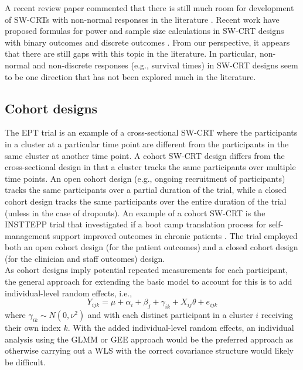\documentclass[10pt]{article}
\begin{document}
A recent review paper commented that there is still much room for development of SW-CRTs with non-normal responses in the literature \parencite{Li:2021}. Recent work have proposed formulas for power and sample size calculations in SW-CRT designs with binary outcomes \parencite{Wang:2021} and discrete outcomes \parencite{Xia:2021}. From our perspective, it appears that there are still gaps with this topic in the literature. In particular, non-normal and non-discrete responses (e.g., survival times) in SW-CRT designs seem to be one direction that has not been explored much in the literature.

\subsection{Cohort designs}

The EPT trial is an example of a cross-sectional SW-CRT where the participants in a cluster at a particular time point are different from the participants in the same cluster at another time point. A cohort SW-CRT design differs from the cross-sectional design in that a cluster tracks the same participants over multiple time points. An open cohort design (e.g., ongoing recruitment of participants) tracks the same participants over a partial duration of the trial, while a closed cohort design tracks the same participants over the entire duration of the trial (unless in the case of dropouts). An example of a cohort SW-CRT is the INSTTEPP trial that investigated if a boot camp translation process for self-management support improved outcomes in chronic patients \parencite{Nease:2018}. The trial employed both an open cohort design (for the patient outcomes) and a closed cohort design (for the clinician and staff outcomes) design.
\\

As cohort designs imply potential repeated measurements for each participant, the general approach for extending the basic model to account for this is to add individual-level random effects, i.e.,
\[
Y_{ijk} = \mu + \alpha_i + \beta_j + \gamma_{ik} + X_{ij}\theta + e_{ijk}
\]
where $\gamma_{ik}\sim N(0,\nu^2)$ and with each distinct participant in a cluster $i$ receiving their own index $k$. With the added individual-level random effects, an individual analysis using the GLMM or GEE approach would be the preferred approach as otherwise carrying out a WLS with the correct covariance structure would likely be difficult.
\\
\end{document}
